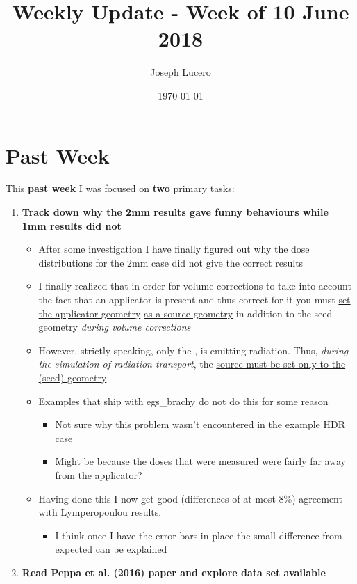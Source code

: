 \documentclass[12pt]{article}
\title{Weekly Update - Week of 10 June 2018}
\author{Joseph Lucero}
\date{\today}
\begin{document}
\maketitle

\section{Past Week}

This \textbf{past week} I was focused on \textbf{two} primary tasks:
\begin{enumerate}
	\item \textbf{Track down why the 2mm results gave funny behaviours while 1mm results did not}
	\begin{itemize}
		\item After some investigation I have finally figured out why the dose distributions for the 2mm case did not give the correct results
		\item I finally realized that in order for volume corrections to take into account the fact that an applicator is present and thus correct for it you must \underline{set the applicator geometry} \underline{as a source geometry} in addition to the seed geometry \emph{during volume corrections}
		\item However, strictly speaking, only the , is emitting radiation. Thus, \emph{during the simulation of radiation transport}, the \underline{source must be set only to the  (seed) geometry}
		\item Examples that ship with egs\_brachy do not do this for some reason
		\begin{itemize}
			\item Not sure why this problem wasn't encountered in the example HDR case
			\item Might be because the doses that were measured were fairly far away from the applicator?
		\end{itemize}
		\item Having done this I now get good (differences of at most 8\%) agreement with Lymperopoulou results. 
		\begin{itemize}
			\item I think once I have the error bars in place the small difference from expected can be explained 
		\end{itemize}
	\end{itemize}
	\item \textbf{Read Peppa et al. (2016) paper and explore data set available}
	\begin{itemize}

\end{itemize}
\end{enumerate}
\end{document}
